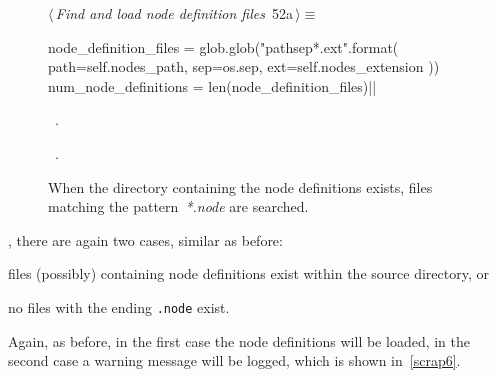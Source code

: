 \documentclass[%
    a4paper,    %
    justified,  %
    nobib,      %
    openany     %
]{tufte-book}
\makeatletter
\renewcommand{\label}[1]{\@tufte@label{##1}}%
\makeatother
\begin{document}
\begin{figure}[!htbp]
  \begin{flushleft} \small
\begin{minipage}{\linewidth}\label{scrap5}\raggedright\small
{} $\langle\,${\itshape Find and load node definition files}\nobreak\ {\footnotesize {52a}}$\,\rangle\equiv$
\vspace{-1ex}
\begin{pythoncode}
node_definition_files = glob.glob("{path}{sep}*.{ext}".format(
    path=self.nodes_path,
    sep=os.sep,
    ext=self.nodes_extension
))
num_node_definitions = len(node_definition_files)|\NWsep|
\end{pythoncode}
\vspace{1.5ex}
\footnotesize
\begin{list}{}{\setlength{\itemsep}{-\parsep}\setlength{\itemindent}{-\leftmargin}}
\item \NWtxtMacroDefBy\ .
\item \NWtxtMacroRefIn\ .

\item{}
\end{list}
\end{minipage}\vspace{4ex}
\end{flushleft}
\caption{When the directory containing the node definitions exists, files
    matching the pattern~\emph{*.node} are searched.}
\end{figure}

, there are again two
cases, similar as before:
\begin{enumerate*}
  \item files (possibly) containing node definitions exist within the source
    directory, or
  \item no files with the ending \verb|.node| exist.
\end{enumerate*}
Again, as before, in the first case the node definitions will be loaded, in the
second case a warning message will be logged, which is shown in~\cref{scrap6}.
\end{document}
